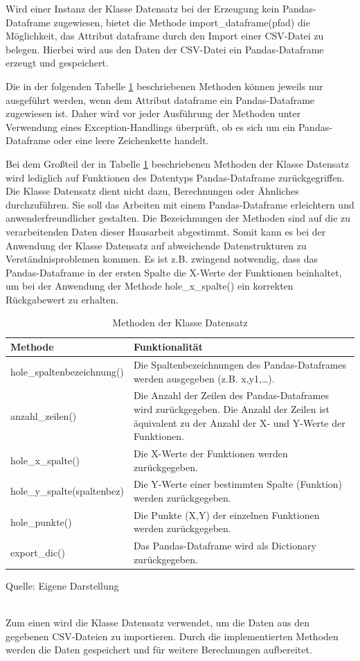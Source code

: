 \documentclass[
    a4paper, 								%
    oneside, 								%
    11pt, 									%
    listof=totoc, 					%
    bibliography=totoc, 		%
    final, 									%
    numbers=noenddot
]{scrreprt}
\begin{document}
Wird einer Instanz der Klasse Datensatz bei der Erzeugung kein Pandas-Dataframe zugewiesen, bietet die Methode import\_dataframe(pfad) die Möglichkeit, das Attribut dataframe durch den Import einer CSV-Datei zu belegen. Hierbei wird aus den Daten der CSV-Datei ein Pandas-Dataframe erzeugt und gespeichert.

Die in der folgenden Tabelle \ref{tab:Klasse_Datensatz} beschriebenen Methoden können jeweils nur ausgeführt werden, wenn dem Attribut dataframe ein Pandas-Dataframe zugewiesen ist. Daher wird vor jeder Ausführung der Methoden unter Verwendung eines Exception-Handlings überprüft, ob es sich um ein Pandas-Dataframe oder eine leere Zeichenkette handelt.

Bei dem Großteil der in Tabelle \ref{tab:Klasse_Datensatz} beschriebenen Methoden der Klasse Datensatz wird lediglich auf Funktionen des Datentyps Pandas-Dataframe zurückgegriffen. Die Klasse Datensatz dient nicht dazu, Berechnungen oder Ähnliches durchzuführen. Sie soll das Arbeiten mit einem Pandas-Dataframe erleichtern und anwenderfreundlicher gestalten. Die Bezeichnungen der Methoden sind auf die zu verarbeitenden Daten dieser Hausarbeit abgestimmt. Somit kann es bei der Anwendung der Klasse Datensatz auf abweichende Datenstrukturen zu Verständnisproblemen kommen. Es ist z.B. zwingend notwendig, dass das Pandas-Dataframe in der ersten Spalte die X-Werte der Funktionen beinhaltet, um bei der Anwendung der Methode hole\_x\_spalte() ein korrekten Rückgabewert zu erhalten. 
\begin{table}[!h]
\centering
\caption{Methoden der Klasse Datensatz}
\vspace{6pt}
\begin{tabularx}{0.95\textwidth}{|l|X|}
\hline
\textbf{Methode} & \textbf{Funktionalität}\\
\hline
hole\_spaltenbezeichnung() & Die Spaltenbezeichnungen des Pandas-Dataframes werden ausgegeben (z.B. x,y1,…).\\
\hline
anzahl\_zeilen() & Die Anzahl der Zeilen des Pandas-Dataframes wird zurückgegeben. Die Anzahl der Zeilen ist äquivalent zu der Anzahl der X- und Y-Werte der Funktionen.\\
\hline
hole\_x\_spalte() & Die X-Werte der Funktionen werden zurückgegeben.\\
\hline
hole\_y\_spalte(spaltenbez) & Die Y-Werte einer bestimmten Spalte (Funktion) werden zurückgegeben.\\
\hline
hole\_punkte() & Die Punkte (X,Y)  der einzelnen Funktionen werden zurückgegeben. \\
\hline
export\_dic() & Das Pandas-Dataframe wird als Dictionary zurückgegeben.\\
\hline
\end{tabularx}
\vspace{6pt}

Quelle: Eigene Darstellung
\label{tab:Klasse_Datensatz}
\end{table}
\\Zum einen wird die Klasse Datensatz verwendet, um die Daten aus den gegebenen CSV-Dateien zu importieren. Durch die implementierten Methoden werden die Daten gespeichert und für weitere Berechnungen aufbereitet. 
\end{document}
